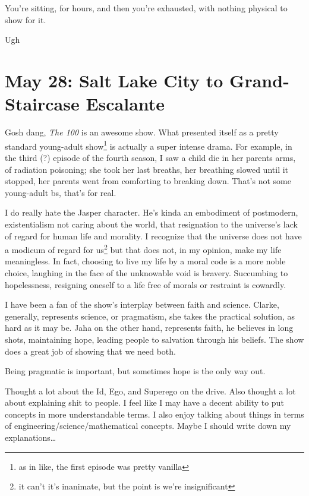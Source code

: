 \documentclass[../butidigress.tex]{subfiles}
\begin{document}
You're sitting, for hours, and then you're exhausted, with nothing physical to show for it.

\entryskip

Ugh

\section{May 28: Salt Lake City to Grand-Staircase Escalante}

Gosh dang, \textit{The 100} is an awesome show.
What presented itself as a pretty standard young-adult show\footnote{as in like, the first episode was pretty vanilla} is actually a super intense drama.
For example, in the third (?) episode of the fourth season, I saw a child die in her parents arms, of radiation poisoning; she took her last breaths, her breathing slowed until it stopped, her parents went from comforting to breaking down.
That's not some young-adult bs, that's for real.

I do really hate the Jasper character.
He's kinda an embodiment of postmodern, existentialism not caring about the world, that resignation to the universe's lack of regard for human life and morality.
I recognize that the universe does not have a modicum of regard for us\footnote{it can't it's inanimate, but the point is we're insignificant} but that does not, in my opinion, make my life meaningless.
In fact, choosing to live my life by a moral code is a more noble choice, laughing in the face of the unknowable void is bravery.
Succumbing to hopelessness, resigning oneself to a life free of morals or restraint is cowardly.

I have been a fan of the show's interplay between faith and science.
Clarke, generally, represents science, or pragmatism, she takes the practical solution, as hard as it may be.
Jaha on the other hand, represents faith, he believes in long shots, maintaining hope, leading people to salvation through his beliefs.
The show does a great job of showing that we need both.

Being pragmatic is important, but sometimes hope is the only way out.

\entryskip


\entryskip

Thought a lot about the Id, Ego, and Superego on the drive.
Also thought a lot about explaining shit to people.
I feel like I may have a decent ability to put concepts in more understandable terms.
I also enjoy talking about things in terms of engineering/science/mathematical concepts.
Maybe I should write down my explanations\ldots
\end{document}
